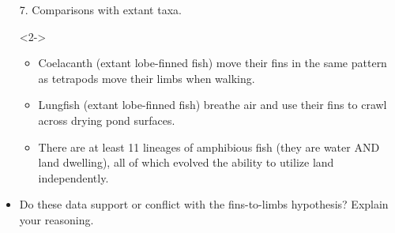 \begin{frame}[t]
    \begin{adjustwidth}{-2em}{-1.5em}

        \begin{itemize}
            \item[7.] Comparisons with extant taxa.

            \begin{uncoverenv}<2->
            \begin{itemize}
                \item Coelacanth (extant lobe-finned fish) move their fins in the
                    same pattern as tetrapods move their limbs when walking.

                \item Lungfish (extant lobe-finned fish) breathe air and use
                    their fins to crawl across drying pond surfaces.

                \item There are at least 11 lineages of amphibious fish (they
                    are water AND land dwelling), all of which evolved the
                    ability to utilize land independently.
            \end{itemize}
            \end{uncoverenv}

            \item<3-> Do these data support or conflict with the fins-to-limbs
                hypothesis? Explain your reasoning.


        \end{itemize}

    \end{adjustwidth}
\end{frame}


